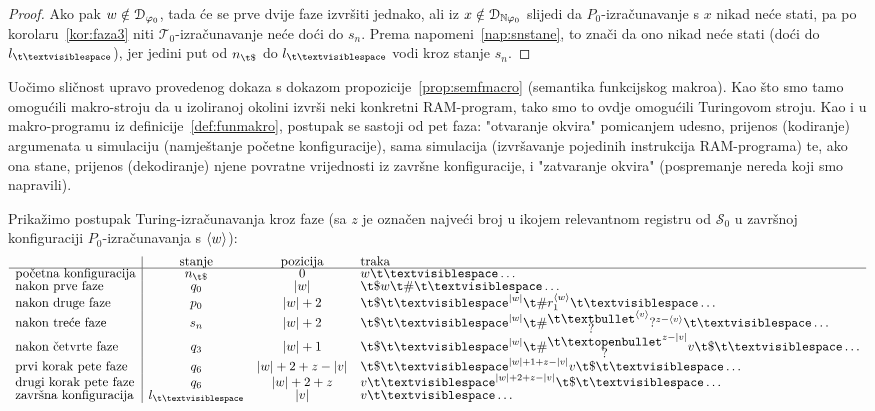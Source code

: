\begin{proof}
    Ako pak $w\notin\mathcal D_{\varphi_0}$, tada će se prve dvije faze izvršiti jednako, ali iz $x\notin\mathcal D_{{\mathbb N}\varphi_0}$ slijedi da $P_0$-izračunavanje s $x$ nikad neće stati, pa po korolaru~\ref{kor:faza3} niti $\mathcal T_0$-izračunavanje neće doći do $s_n$. Prema napomeni~\ref{nap:snstane}, to znači da ono nikad neće stati (doći do $l_{\bl}$), jer jedini put od $n_{\t\$}$ do $l_{\bl}$ vodi kroz stanje $s_n$.
\end{proof}

Uočimo sličnost upravo provedenog dokaza s dokazom propozicije~\ref{prop:semfmacro} (semantika funkcijskog makroa). Kao što smo tamo omogućili makro-stroju da u izoliranoj okolini izvrši neki konkretni RAM-program, tako smo to ovdje omogućili Turingovom stroju. Kao i u makro-programu iz definicije~\ref{def:funmakro}, postupak se sastoji od pet faza: "otvaranje okvira" pomicanjem udesno, prijenos (kodiranje) argumenata u simulaciju (namještanje početne konfiguracije), sama simulacija (izvršavanje pojedinih instrukcija RAM-programa) te, ako ona stane, prijenos (dekodiranje) njene povratne vrijednosti iz završne konfiguracije, i "zatvaranje okvira" (pospremanje nereda koji smo napravili).

Prikažimo postupak Turing-iz\-ra\-ču\-na\-va\-nja kroz faze (sa $z$ je označen najveći broj u ikojem relevantnom registru od $\mathcal S_0$ u završnoj konfiguraciji $P_0$-izračunavanja s $\langle w\rangle$):
\begin{equation}
\begin{array}{l|ccl}
                             &\text{stanje}&\text{pozicija}&\text{traka}\\\hline
    \text{početna konfiguracija} & n_{\t\$} & 0         & w\bl\ldots \\
\text{nakon prve faze}       & q_0 & \dulj w   & \t\$w\t\#\bl\ldots \\
\text{nakon druge faze}      & p_0 & \dulj w+2 & \t\$\bl^{\dulj w}\t\#r_1^{\kr w}\bl\ldots \\
\text{nakon treće faze}      & s_n & \dulj w+2 & \renewcommand{\arraystretch}{0.1}
    \t\$\bl^{\dulj w}\t\#\begin{array}{@{}c@{}}\t\textbullet\\?\end{array}^{\kr{v}}?^{z-\kr{v}}\bl\ldots\\
\text{nakon četvrte faze}    & q_3 & \dulj w+1 &
\renewcommand{\arraystretch}{0.1}
\t\$\bl^{\dulj w}\t\#\begin{array}{@{}c@{}}\t\textopenbullet\\?\end{array}^{z-\dulj v}v\t\$\bl\ldots\\
\text{prvi korak pete faze} & q_6 & \dulj w+2+z-\dulj v       & \t\$\bl^{\dulj w+1+z-\dulj v}v\t\$\bl\ldots\\
\text{drugi korak pete faze}& q_6 & \dulj w+2+z & v\bl^{\dulj w+2+z-\dulj v}\t\$\bl\ldots\\
\text{završna konfiguracija} & l_{\bl} & \dulj v   & v\bl\ldots
\end{array}
\end{equation}

